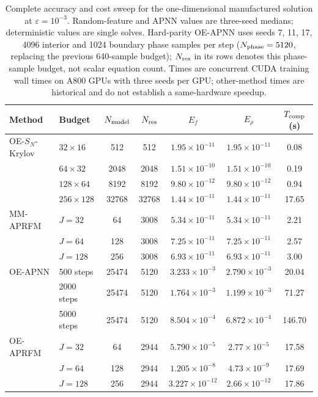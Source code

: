 \begin{table}[!htb]
\centering\small
\setlength{\tabcolsep}{2.8pt}
\caption{Complete accuracy and cost sweep for the one-dimensional manufactured solution at $\varepsilon=10^{-3}$. Random-feature and APNN values are three-seed medians; deterministic values are single solves. Hard-parity OE-APNN uses seeds 7, 11, 17, 4096 interior and 1024 boundary phase samples per step ($N_{\rm phase}=5120$, replacing the previous 640-sample budget); $N_{\rm res}$ in its rows denotes this phase-sample budget, not scalar equation count. Times are concurrent CUDA training wall times on A800 GPUs with three seeds per GPU; other-method times are historical and do not establish a same-hardware speedup.}
\label{tab:supp-efficiency}
\begin{tabular}{llccccc}
\toprule
Method & Budget & $N_{\rm model}$ & $N_{\rm res}$ & $E_f$ & $E_\rho$ & $T_{\rm comp}$ (s)\\
\midrule
OE-$S_N$-Krylov & $32\times16$ & 512 & 512 & $1.95\times10^{-11}$ & $1.95\times10^{-11}$ & 0.08\\
 & $64\times32$ & 2048 & 2048 & $1.51\times10^{-10}$ & $1.51\times10^{-10}$ & 0.19\\
 & $128\times64$ & 8192 & 8192 & $9.80\times10^{-12}$ & $9.80\times10^{-12}$ & 0.94\\
 & $256\times128$ & 32768 & 32768 & $1.44\times10^{-11}$ & $1.44\times10^{-11}$ & 17.65\\
\addlinespace
MM-APRFM & $J=32$ & 64 & 3008 & $5.34\times10^{-11}$ & $5.34\times10^{-11}$ & 2.21\\
 & $J=64$ & 128 & 3008 & $7.25\times10^{-11}$ & $7.25\times10^{-11}$ & 2.57\\
 & $J=128$ & 256 & 3008 & $6.93\times10^{-11}$ & $6.93\times10^{-11}$ & 3.00\\
\addlinespace
OE-APNN & 500 steps & 25474 & 5120 & $3.233\times10^{-3}$ & $2.790\times10^{-3}$ & 20.04\\
  & 2000 steps & 25474 & 5120 & $1.764\times10^{-3}$ & $1.199\times10^{-3}$ & 71.27\\
  & 5000 steps & 25474 & 5120 & $8.504\times10^{-4}$ & $6.872\times10^{-4}$ & 146.70\\
\addlinespace
OE-APRFM & $J=32$ & 64 & 2944 & $5.790\times10^{-5}$ & $2.77\times10^{-5}$ & 17.58\\
 & $J=64$ & 128 & 2944 & $1.205\times10^{-8}$ & $4.73\times10^{-9}$ & 17.69\\
 & $J=128$ & 256 & 2944 & $3.227\times10^{-12}$ & $2.66\times10^{-12}$ & 17.86\\
\bottomrule
\end{tabular}
\end{table}

